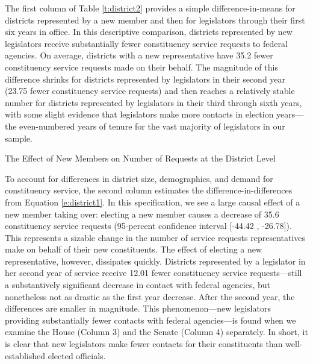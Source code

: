 \documentclass[12pt]{article}
\begin{document}
The first column of Table \ref{t:district2} provides a simple difference-in-means for districts represented by a new member and then for legislators through their first six years in office. In this descriptive comparison, districts represented by new legislators receive substantially fewer constituency service requests to federal agencies. On average, districts with a new representative have 35.2 fewer constituency service requests made on their behalf. The magnitude of this difference shrinks for districts represented by legislators in their second year (23.75 fewer constituency service requests) and then reaches a relatively stable number for districts represented by legislators in their third through sixth years, with some slight evidence that legislators make more contacts in election years---the even-numbered years of tenure for the vast majority of legislators in our sample. 



\begin{table}[hbt!]
\caption{The Effect of New Members on Number of Requests at the District Level} \label{t:district2}
\begin{minipage}{\textwidth}
\begin{center}

\end{center}
\end{minipage}
\end{table}


To account for differences in district size, demographics, and demand for constituency service, the second column estimates the difference-in-differences from Equation \ref{e:district1}. In this specification, we see a large causal effect of a new member taking over: electing a new member causes a decrease of 35.6 constituency service requests (95-percent confidence interval [-44.42 , -26.78]). This represents a sizable change in the number of service requests representatives make on behalf of their new constituents. The effect of electing a new representative, however, dissipates quickly. Districts represented by a legislator in her second year of service receive 12.01 fewer constituency service requests---still a substantively significant decrease in contact with federal agencies, but nonetheless not as drastic as the first year decrease. After the second year, the differences are smaller in magnitude. This phenomenon---new legislators providing substantially fewer contacts with federal agencies---is found when we examine the House (Column 3) and the Senate (Column 4) separately. In short, it is clear that new legislators make fewer contacts for their constituents than well-established elected officials.  
\end{document}
